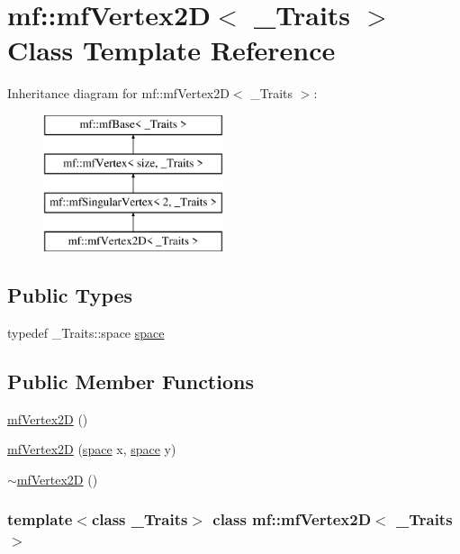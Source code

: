 \hypertarget{classmf_1_1mfVertex2D}{
\section{mf::mfVertex2D$<$ \_\-Traits $>$ Class Template Reference}
\label{classmf_1_1mfVertex2D}
}
Inheritance diagram for mf::mfVertex2D$<$ \_\-Traits $>$:\begin{figure}[H]
\begin{center}
\leavevmode
\includegraphics[height=4.000000cm]{classmf_1_1mfVertex2D}
\end{center}
\end{figure}
\subsection*{Public Types}
\begin{DoxyCompactItemize}
\item 
typedef \_\-Traits::space \hyperlink{classmf_1_1mfVertex2D_a0730a219bea43b0b049cae2b4c72527b}{space}
\end{DoxyCompactItemize}
\subsection*{Public Member Functions}
\begin{DoxyCompactItemize}
\item 
\hyperlink{classmf_1_1mfVertex2D_a0e8d7770cc851b6e5ebfad22730c7e9c}{mfVertex2D} ()
\item 
\hyperlink{classmf_1_1mfVertex2D_ac81496cd8d9193bab0e9cde62fa891e4}{mfVertex2D} (\hyperlink{classmf_1_1mfVertex_a9710b0b7ac7bbb276e1e97d541cbfc93}{space} x, \hyperlink{classmf_1_1mfVertex_a9710b0b7ac7bbb276e1e97d541cbfc93}{space} y)
\item 
\hyperlink{classmf_1_1mfVertex2D_a9f275e28ff046869c8ce6345fe2d9f15}{$\sim$mfVertex2D} ()
\end{DoxyCompactItemize}
\subsubsection*{template$<$class \_\-Traits$>$ class mf::mfVertex2D$<$ \_\-Traits $>$}



